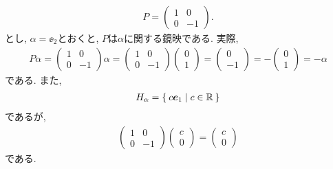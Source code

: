 \begin{example}
  \begin{align*}
    P=
    \begin{pmatrix}
      1 & 0 \\
      0 & -1 
    \end{pmatrix}.
  \end{align*}
  とし,
  $\alpha=\ee_2$とおくと,
  $P$は$\alpha$に関する鏡映である.
実際, 
\begin{align*}
  P\alpha = 
      \begin{pmatrix}
      1 & 0 \\
      0 & -1 
      \end{pmatrix}
      \alpha
    =
      \begin{pmatrix}
      1 & 0 \\
      0 & -1 
    \end{pmatrix}
    \begin{pmatrix}
      0  \\
      1  
    \end{pmatrix}
    =
    \begin{pmatrix}
      0  \\
      -1  
    \end{pmatrix}
    =
    -
    \begin{pmatrix}
      0  \\
      1  
    \end{pmatrix}
    =
    -\alpha
\end{align*}
である.  また,
\begin{align*}
  H_\alpha = \Set{c \boldsymbol{e}_1 | c\in \mathbb{R}}
\end{align*}
であるが,
\begin{align*}
    \begin{pmatrix}
      1 & 0 \\
      0 & -1 
    \end{pmatrix}
    \begin{pmatrix}
      c  \\
      0  
    \end{pmatrix}
    =
    \begin{pmatrix}
      c  \\
      0  
    \end{pmatrix}
\end{align*}
である.
\end{example}

